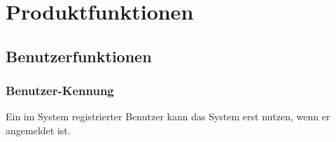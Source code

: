 \section{Produktfunktionen}


\subsection{Benutzerfunktionen}

\subsubsection{Benutzer-Kennung}

Ein im System registrierter Benutzer kann das System erst nutzen, wenn er angemeldet ist.

